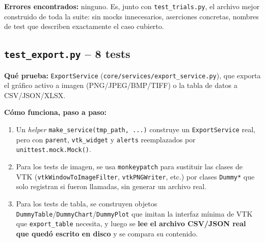 \documentclass[11pt,a4paper]{article}
\begin{document}
\textbf{Errores encontrados:} ninguno. Es, junto con \texttt{test\_\allowbreak trials.py}, el archivo mejor construido de
toda la suite: sin mocks innecesarios, aserciones concretas, nombres de test que describen exactamente el
caso cubierto.

\subsection{\texttt{test\_\allowbreak export.py} -- 8 tests}

\textbf{Qué prueba:} \texttt{ExportService} (\texttt{core/services/export\_\allowbreak service.py}), que exporta el
gráfico activo a imagen (PNG/JPEG/BMP/TIFF) o la tabla de datos a CSV/JSON/XLSX.

\textbf{Cómo funciona, paso a paso:}
\begin{enumerate}
  \item Un \textit{helper} \texttt{make\_\allowbreak service(tmp\_\allowbreak path, ...)} construye un \texttt{ExportService} real,
        pero con \texttt{parent}, \texttt{vtk\_\allowbreak widget} y \texttt{alerts} reemplazados por
        \texttt{unittest.mock.Mock()}.
  \item Para los tests de imagen, se usa \texttt{monkeypatch} para sustituir las clases de VTK
        (\texttt{vtkWindowToImageFilter}, \texttt{vtkPNGWriter}, etc.) por clases \texttt{Dummy*} que solo
        registran si fueron llamadas, sin generar un archivo real.
  \item Para los tests de tabla, se construyen objetos \texttt{DummyTable}/\texttt{DummyChart}/\texttt{DummyPlot}
        que imitan la interfaz mínima de VTK que \texttt{export\_\allowbreak table} necesita, y luego se \textbf{lee el
        archivo CSV/JSON real que quedó escrito en disco} y se compara su contenido.
\end{enumerate}
\end{document}
